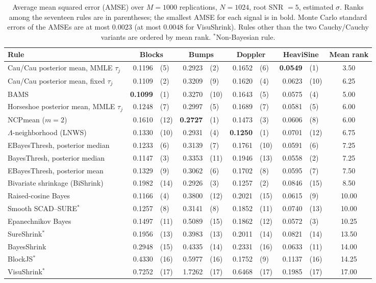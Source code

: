 \begin{table}[thb]
\centering
\caption{Average mean squared error (AMSE) over $M=1000$ replications,
$N=1024$, root SNR $=5$, estimated $\sigma$. Ranks among the seventeen
rules are in parentheses; the smallest AMSE for each signal is in bold.
Monte Carlo standard errors of the AMSEs are at most $0.0023$ (at most
$0.0048$ for VisuShrink). Rules other than the two Cauchy/Cauchy
variants are ordered by mean rank. $^{\ast}$Non-Bayesian rule.}
\label{tab:dj_amse}
\small
\setlength{\tabcolsep}{3.2pt}
\begin{tabular}{@{}l r@{\,}l r@{\,}l r@{\,}l r@{\,}l c@{}}
\toprule
Rule & \multicolumn{2}{c}{Blocks} & \multicolumn{2}{c}{Bumps}
     & \multicolumn{2}{c}{Doppler} & \multicolumn{2}{c}{HeaviSine}
     & Mean rank\\
\midrule


Cau/Cau posterior mean, MMLE $\tau_j$ & 0.1196 & (5) & 0.2923 & (2) & 0.1652 & (6) & \textbf{0.0549} & (1) & 3.50 \\
Cau/Cau posterior mean, fixed $\tau_j$ & 0.1109 & (2) & 0.3209 & (9) & 0.1620 & (4) & 0.0623 & (10) & 6.25 \\
\midrule
BAMS & \textbf{0.1099} & (1) & 0.3270 & (10) & 0.1643 & (5) & 0.0575 & (4) & 5.00 \\
Horseshoe posterior mean, MMLE $\tau_j$ & 0.1248 & (7) & 0.2997 & (5) & 0.1689 & (7) & 0.0581 & (5) & 6.00 \\
NCPmean ($m=2$) & 0.1610 & (12) & \textbf{0.2727} & (1) & 0.1473 & (3) & 0.0606 & (8) & 6.00 \\
$\Lambda$-neighborhood (LNWS) & 0.1330 & (10) & 0.2931 & (4) & \textbf{0.1250} & (1) & 0.0701 & (12) & 6.75 \\
EBayesThresh, posterior median & 0.1233 & (6) & 0.3139 & (7) & 0.1761 & (10) & 0.0591 & (6) & 7.25 \\
BayesThresh, posterior median & 0.1147 & (3) & 0.3353 & (11) & 0.1946 & (13) & 0.0558 & (2) & 7.25 \\
EBayesThresh, posterior mean & 0.1329 & (9) & 0.3062 & (6) & 0.1702 & (8) & 0.0595 & (7) & 7.50 \\
Bivariate shrinkage (BiShrink) & 0.1982 & (14) & 0.2926 & (3) & 0.1257 & (2) & 0.0846 & (15) & 8.50 \\
Raised-cosine Bayes & 0.1166 & (4) & 0.3800 & (12) & 0.2021 & (15) & 0.0615 & (9) & 10.00 \\
Smooth SCAD--SURE$^{\ast}$ & 0.1257 & (8) & 0.3141 & (8) & 0.1852 & (11) & 0.0740 & (13) & 10.00 \\
Epanechnikov Bayes & 0.1497 & (11) & 0.5089 & (15) & 0.1862 & (12) & 0.0572 & (3) & 10.25 \\
SureShrink$^{\ast}$ & 0.1956 & (13) & 0.3983 & (13) & 0.2011 & (14) & 0.0821 & (14) & 13.50 \\
BayesShrink & 0.2948 & (15) & 0.4335 & (14) & 0.2331 & (16) & 0.0633 & (11) & 14.00 \\
BlockJS$^{\ast}$ & 0.4330 & (16) & 0.5977 & (16) & 0.1752 & (9) & 0.1137 & (16) & 14.25 \\
VisuShrink$^{\ast}$ & 0.7252 & (17) & 1.7262 & (17) & 0.6468 & (17) & 0.1985 & (17) & 17.00 \\
\bottomrule
\end{tabular}
\end{table}
